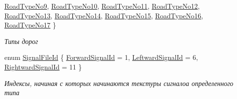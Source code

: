 \begin{DoxyCompactItemize}
\hyperlink{namespacertm_abde1dc022a0c505026f6f4da1340cb85a91b030c2213d31a89adb46729e6dabf8}{Road\+Type\+No9}, 
\hyperlink{namespacertm_abde1dc022a0c505026f6f4da1340cb85a8fadd2f71be403751ade0dff6c448b1c}{Road\+Type\+No10}, 
\hyperlink{namespacertm_abde1dc022a0c505026f6f4da1340cb85a493a3813765e2c3f23bcabd5818884a5}{Road\+Type\+No11}, 
\newline
\hyperlink{namespacertm_abde1dc022a0c505026f6f4da1340cb85a02ce542dacb335ee459a3dc5513add1e}{Road\+Type\+No12}, 
\hyperlink{namespacertm_abde1dc022a0c505026f6f4da1340cb85a970b3ae6b43d901587f19b13edacaf9b}{Road\+Type\+No13}, 
\hyperlink{namespacertm_abde1dc022a0c505026f6f4da1340cb85ad2eb851c867b95d0552ef28290640394}{Road\+Type\+No14}, 
\hyperlink{namespacertm_abde1dc022a0c505026f6f4da1340cb85a5bb2b701dd24f665d666d1fd7ce883dd}{Road\+Type\+No15}, 
\newline
\hyperlink{namespacertm_abde1dc022a0c505026f6f4da1340cb85a6c9da231409783c1ac5a3a4f99163394}{Road\+Type\+No16}, 
\hyperlink{namespacertm_abde1dc022a0c505026f6f4da1340cb85a252f4e86aab36a8539eb48a17a96be7c}{Road\+Type\+No17}
 \}\begin{DoxyCompactList}\small\item\em Типы дорог \end{DoxyCompactList}
\item 
enum \hyperlink{namespacertm_a4d86818f874975d3dc9f0f10feefc9c1}{Signal\+File\+Id} \{ \hyperlink{namespacertm_a4d86818f874975d3dc9f0f10feefc9c1a76558b4ee249fc454bbdb1d64d2fe0e9}{Forward\+Signal\+Id} = 1, 
\hyperlink{namespacertm_a4d86818f874975d3dc9f0f10feefc9c1aeff2fccef911bffb13ae08bc9f2dd926}{Leftward\+Signal\+Id} = 6, 
\hyperlink{namespacertm_a4d86818f874975d3dc9f0f10feefc9c1a9cbadfb5a62cec9d481f6525a51e5712}{Rightward\+Signal\+Id} = 11
 \}\begin{DoxyCompactList}\small\item\em Индексы, начиная с которых начинаются текстуры сигналоа определенного типа \end{DoxyCompactList}
\end{DoxyCompactItemize}
